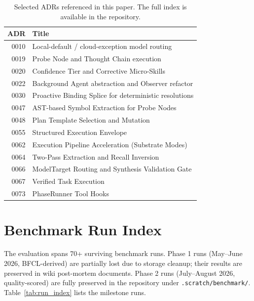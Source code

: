 \documentclass{article}
\begin{document}
\begin{table}[h]
\centering
\small
\begin{tabular}{@{}rl@{}}
\toprule
\textbf{ADR} & \textbf{Title} \\
\midrule
0010 & Local-default / cloud-exception model routing \\
0019 & Probe Node and Thought Chain execution \\
0020 & Confidence Tier and Corrective Micro-Skills \\
0022 & Background Agent abstraction and Observer refactor \\
0030 & Proactive Binding Splice for deterministic resolutions \\
0047 & AST-based Symbol Extraction for Probe Nodes \\
0048 & Plan Template Selection and Mutation \\
0055 & Structured Execution Envelope \\
0062 & Execution Pipeline Acceleration (Substrate Modes) \\
0064 & Two-Pass Extraction and Recall Inversion \\
0066 & ModelTarget Routing and Synthesis Validation Gate \\
0067 & Verified Task Execution \\
0073 & PhaseRunner Tool Hooks \\
\bottomrule
\end{tabular}
\caption{Selected ADRs referenced in this paper. The full index is available in the repository.}
\end{table}

\section{Benchmark Run Index}
\label{app:benchmark_index}

The evaluation spans 70+ surviving benchmark runs.
Phase 1 runs (May--June 2026, BFCL-derived) are partially lost due to storage cleanup; their results are preserved in wiki post-mortem documents.
Phase 2 runs (July--August 2026, quality-scored) are fully preserved in the repository under \texttt{.scratch/benchmark/}.
Table~\ref{tab:run_index} lists the milestone runs.
\end{document}
